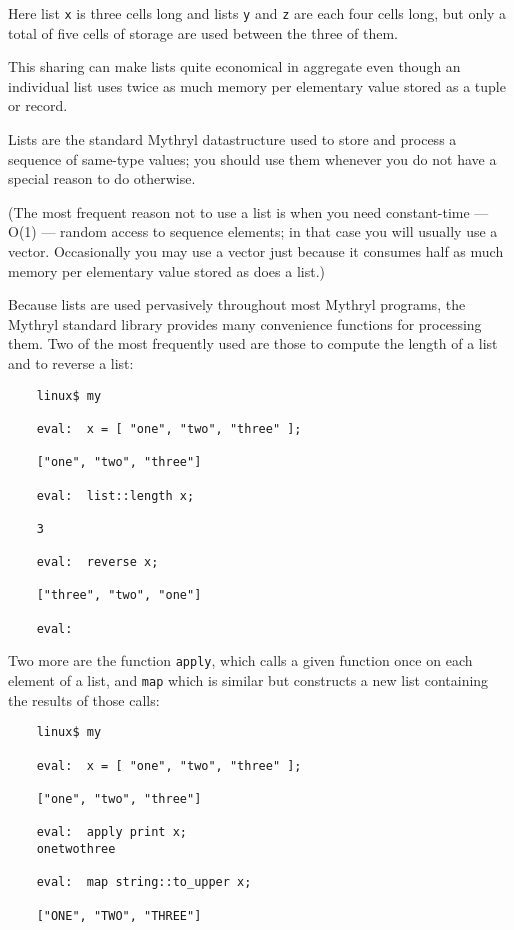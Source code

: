 Here list {\tt x} is three cells long and lists {\tt y} and {\tt z} are 
each four cells long, but only a total of five cells of storage are 
used between the three of them.

This sharing can make lists quite economical in aggregate even though 
an individual list uses twice as much memory per elementary value 
stored as a tuple or record.

Lists are the standard Mythryl datastructure used to store and process 
a sequence of same-type values;  you should use them whenever you do not 
have a special reason to do otherwise.

(The most frequent reason not to use a list is when you need constant-time 
--- O(1) --- random access to sequence elements; in that case you will usually use 
a vector.  Occasionally you may use a vector just because it consumes 
half as much memory per elementary value stored as does a list.)

Because lists are used pervasively throughout most Mythryl programs, 
the Mythryl standard library provides many convenience functions for 
processing them.  Two of the most frequently used are those to compute 
the length of a list and to reverse a list:

\begin{verbatim}
    linux$ my

    eval:  x = [ "one", "two", "three" ];

    ["one", "two", "three"]

    eval:  list::length x;

    3

    eval:  reverse x;

    ["three", "two", "one"]

    eval:  
\end{verbatim}

Two more are the function {\tt apply}, which calls a given 
function once on each element of a list, and {\tt map} which 
is similar but constructs a new list containing the results 
of those calls:

\begin{verbatim}
    linux$ my

    eval:  x = [ "one", "two", "three" ];

    ["one", "two", "three"]

    eval:  apply print x;
    onetwothree

    eval:  map string::to_upper x;

    ["ONE", "TWO", "THREE"]
\end{verbatim}

